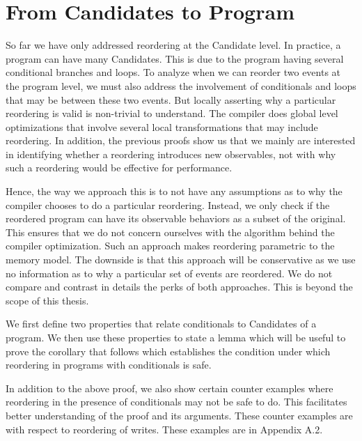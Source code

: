\section{From Candidates to Program}

    So far we have only addressed reordering at the Candidate level. 
    In practice, a program can have many Candidates. 
    This is due to the program having several conditional branches and loops. 
    To analyze when we can reorder two events at the program level, we must also address the involvement of conditionals and loops that may be between these two events.
    But locally asserting why a particular reordering is valid is non-trivial to understand. 
    The compiler does global level optimizations that involve several local transformations that may include reordering. 
    In addition, the previous proofs show us that we mainly are interested in identifying whether a reordering introduces new observables, not with why such a reordering would be effective for performance.

    Hence, the way we approach this is to not have any assumptions as to why the compiler chooses to do a particular reordering. 
    Instead, we only check if the reordered program can have its observable behaviors as a subset of the original. 
    This ensures that we do not concern ourselves with the algorithm behind the compiler optimization. 
    Such an approach makes reordering parametric to the memory model. 
    The downside is that this approach will be conservative as we use no information as to why a particular set of events are reordered. 
    We do not compare and contrast in details the perks of both approaches. 
    This is beyond the scope of this thesis.

    We first define two properties that relate conditionals to Candidates of a program.
    We then use these properties to state a lemma which will be useful to prove the corollary that follows which establishes the condition under which reordering in programs with conditionals is safe. 
    
    

    In addition to the above proof, we also show certain counter examples where reordering in the presence of conditionals may not be safe to do. 
    This facilitates better understanding of the proof and its arguments. 
    These counter examples are with respect to reordering of writes. 
    These examples are in Appendix A.2.

    